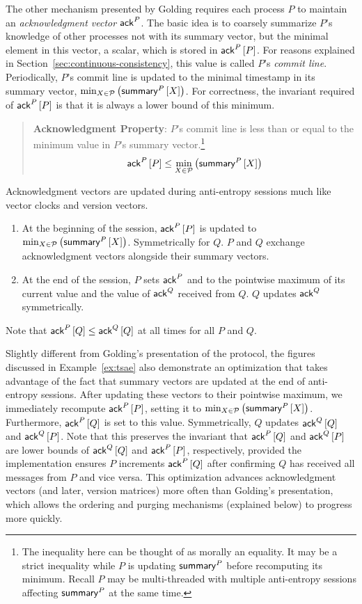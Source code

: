 \documentclass[]             %
{NASA}                       %
\theoremstyle{definition}
\begin{document}
The other mechanism presented by Golding requires each process $P$
to maintain an \emph{acknowledgment vector} $\mathsf{ack}^{P}$. The basic idea
is to coarsely summarize $P$'s knowledge of other processes not with
its summary vector, but the minimal element in this vector, a scalar,
which is stored in $\mathsf{ack}^{P}\left[P\right]$. For reasons explained in
Section~\ref{sec:continuous-consistency}, this value is called $P$'s \emph{commit
  line}. Periodically, $P$'s commit line is updated to the minimal
timestamp in its summary vector,
$\min_{X \in \mathcal{P}} \left(\mathsf{summary}^{P}\left[X\right]\right)$.  For correctness,
the invariant required of $\mathsf{ack}^{P}\left[P\right]$ is that it is always a lower
bound of this minimum.
\begin{quote}
  \textbf{Acknowledgment Property}: $P$'s commit line is less than or
  equal to the minimum value in $P$'s summary vector.\footnote{The
    inequality here can be thought of as morally an equality. It may
    be a strict inequality while $P$ is updating $\mathsf{summary}^{P}$
    before recomputing its minimum. Recall $P$ may be multi-threaded
    with multiple anti-entropy sessions affecting $\mathsf{summary}^{P}$ at
    the same time.}
  \begin{equation*}
    \mathsf{ack}^{P}\left[P\right] \leq \min_{X \in \mathcal{P}} \left(\mathsf{summary}^{P}\left[X\right]\right)
\end{equation*}
\end{quote}

Acknowledgment vectors are updated during anti-entropy sessions much
like vector clocks and version vectors.
\begin{enumerate}
\item At the beginning of the session, $\mathsf{ack}^{P}\left[P\right]$ is updated to
  $\min_{X \in \mathcal{P}} \left(\mathsf{summary}^{P}\left[X\right]\right)$. Symmetrically
  for $Q$. $P$ and $Q$ exchange acknowledgment vectors alongside
  their summary vectors.
\item At the end of the session, $P$ sets $\mathsf{ack}^{P}$ and to the
  pointwise maximum of its current value and the value of $\mathsf{ack}^{Q}$
  received from $Q$. $Q$ updates $\mathsf{ack}^{Q}$ symmetrically.
\end{enumerate}
Note that $\mathsf{ack}^{P}\left[Q\right] \leq \mathsf{ack}^{Q}\left[Q\right]$ at all times for all $P$ and
$Q$.

Slightly different from Golding's presentation of the protocol, the
figures discussed in Example~\ref{ex:tsae} also demonstrate an
optimization that takes advantage of the fact that summary vectors are
updated at the end of anti-entropy sessions. After updating these
vectors to their pointwise maximum, we immediately recompute
$\mathsf{ack}^{P}\left[P\right]$, setting it to
$\min_{X \in \mathcal{P}} \left(\mathsf{summary}^{P}\left[X\right]\right)$. Furthermore,
$\mathsf{ack}^{P}\left[Q\right]$ is set to this value. Symmetrically, $Q$ updates
$\mathsf{ack}^{Q}\left[Q\right]$ and $\mathsf{ack}^{Q}\left[P\right]$. Note that this preserves the invariant
that $\mathsf{ack}^{P}\left[Q\right]$ and $\mathsf{ack}^{Q}\left[P\right]$ are lower bounds of $\mathsf{ack}^{Q}\left[Q\right]$
and $\mathsf{ack}^{P}\left[P\right]$, respectively, provided the implementation ensures
$P$ increments $\mathsf{ack}^{P}\left[Q\right]$ after confirming $Q$ has received all
messages from $P$ and vice versa. This optimization advances
acknowledgment vectors (and later, version matrices) more often than
Golding's presentation, which allows the ordering and purging
mechanisms (explained below) to progress more quickly.
\end{document}
